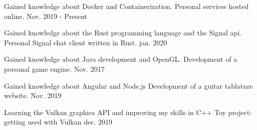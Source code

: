 

\begin{cventries}

  \cventry
    {Gained knowledge about Docker and Containerization.} %
    {Personal services hosted online.} %
    {} %
    {Nov. 2019 - Present} %

  \cventry
    {Gained knowledge about the Rust programming language and the Signal api.} %
    {Personal Signal chat client written in Rust.} %
    {} %
    {jan. 2020} %

  \cventry
    {Gained knowledge about Java development and OpenGL.} %
    {Development of a personal game engine.} %
    {} %
    {Nov. 2017} %

  \cventry
    {Gained knowledge about Angular and Node.js} %
    {Development of a guitar tablature website.} %
    {} %
    {Nov. 2019} %

  \cventry
    {Learning the Vulkan graphics API and improving my skills in C++} %
    {Toy project: getting used with Vulkan} %
    {} %
    {dec. 2019} %

\end{cventries}
